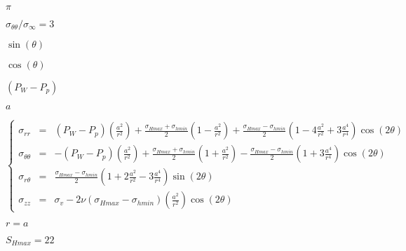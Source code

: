 \documentclass[onecolumn,11pt]{report}
\def\lthtmlcheckvsize{\ifdim\ht\sizebox<\vsize 
  \ifdim\wd\sizebox<\hsize\expandafter\hfill\fi \expandafter\vfill
  \else\expandafter\vss\fi}%
\begin{document}
{\newpage\clearpage
{}%
$ \pi$%
\lthtmlindisplaymathZ
\lthtmlcheckvsize\clearpage}

{\newpage\clearpage
{}%
$ \sigma_{\theta \theta}/\sigma_{\infty}=3$%
\lthtmlindisplaymathZ
\lthtmlcheckvsize\clearpage}

{\newpage\clearpage
{}%
$ \sin (\theta)$%
\lthtmlindisplaymathZ
\lthtmlcheckvsize\clearpage}

{\newpage\clearpage
{}%
$ \cos (\theta)$%
\lthtmlindisplaymathZ
\lthtmlcheckvsize\clearpage}

{\newpage\clearpage
{}%
$ (P_W - P_p)$%
\lthtmlindisplaymathZ
\lthtmlcheckvsize\clearpage}

{\newpage\clearpage
{}%
$ a$%
\lthtmlindisplaymathZ
\lthtmlcheckvsize\clearpage}

{\newpage\clearpage
{}%
\begin{displaymath}\left\lbrace
\begin{array}{rcl}
\sigma_{rr} & = &
(P_W - P_p) \left( \frac{a^2}{r^2} \right) +
\frac{\sigma_{Hmax}+\sigma_{hmin}}{2} \left( 1 -\frac{a^2}{r^2} \right) +
\frac{\sigma_{Hmax}-\sigma_{hmin}}{2} \left( 1 -4 \frac{a^2}{r^2} +3 \frac{a^4}{r^4} \right) \cos (2\theta) \\
\sigma_{\theta \theta} & = &
-(P_W - P_p) \left( \frac{a^2}{r^2} \right)
+\frac{\sigma_{Hmax}+\sigma_{hmin}}{2} \left( 1 +\frac{a^2}{r^2} \right) -
\frac{\sigma_{Hmax}-\sigma_{hmin}}{2} \left( 1 +3 \frac{a^4}{r^4} \right) \cos (2\theta) \\
\sigma_{r \theta} & = &
\frac{\sigma_{Hmax}-\sigma_{hmin}}{2} \left( 1 +2 \frac{a^2}{r^2} -3 \frac{a^4}{r^4} \right) \sin (2\theta) \\
\sigma_{zz} & = & \sigma_v - 2 \nu \left( \sigma_{Hmax}-\sigma_{hmin} \right) \left( \frac{a^2}{r^2} \right) \cos (2\theta)
\end{array}
\right.\end{displaymath}%
\lthtmldisplayZ
\lthtmlcheckvsize\clearpage}

{\newpage\clearpage
{}%
$ r=a$%
\lthtmlindisplaymathZ
\lthtmlcheckvsize\clearpage}

{\newpage\clearpage
{}%
$ S_{Hmax}=22$%
\lthtmlindisplaymathZ
\lthtmlcheckvsize\clearpage}
\end{document}
